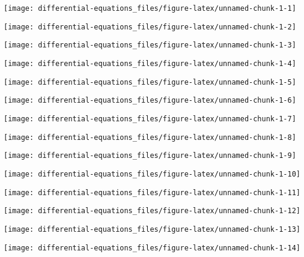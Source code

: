 \documentclass[]{tufte-handout}
\begin{document}
\begin{marginfigure}
\texttt{[image: differential-equations\_files/figure-latex/unnamed-chunk-1-1]} \end{marginfigure}
\begin{marginfigure}
\texttt{[image: differential-equations\_files/figure-latex/unnamed-chunk-1-2]} \end{marginfigure}
\begin{marginfigure}
\texttt{[image: differential-equations\_files/figure-latex/unnamed-chunk-1-3]} \end{marginfigure}
\begin{marginfigure}
\texttt{[image: differential-equations\_files/figure-latex/unnamed-chunk-1-4]} \end{marginfigure}
\begin{marginfigure}
\texttt{[image: differential-equations\_files/figure-latex/unnamed-chunk-1-5]} \end{marginfigure}
\begin{marginfigure}
\texttt{[image: differential-equations\_files/figure-latex/unnamed-chunk-1-6]} \end{marginfigure}
\begin{marginfigure}
\texttt{[image: differential-equations\_files/figure-latex/unnamed-chunk-1-7]} \end{marginfigure}
\begin{marginfigure}
\texttt{[image: differential-equations\_files/figure-latex/unnamed-chunk-1-8]} \end{marginfigure}
\begin{marginfigure}
\texttt{[image: differential-equations\_files/figure-latex/unnamed-chunk-1-9]} \end{marginfigure}
\begin{marginfigure}
\texttt{[image: differential-equations\_files/figure-latex/unnamed-chunk-1-10]} \end{marginfigure}
\begin{marginfigure}
\texttt{[image: differential-equations\_files/figure-latex/unnamed-chunk-1-11]} \end{marginfigure}
\begin{marginfigure}
\texttt{[image: differential-equations\_files/figure-latex/unnamed-chunk-1-12]} \end{marginfigure}
\begin{marginfigure}
\texttt{[image: differential-equations\_files/figure-latex/unnamed-chunk-1-13]} \end{marginfigure}
\begin{marginfigure}
\texttt{[image: differential-equations\_files/figure-latex/unnamed-chunk-1-14]} \end{marginfigure}
\end{document}
